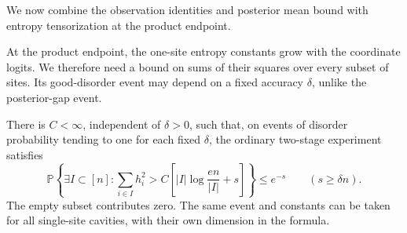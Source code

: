 We now combine the observation identities and posterior mean bound with
entropy tensorization at the product endpoint.

At the product endpoint, the one-site entropy constants grow with the
coordinate logits.  We therefore need a bound on sums of their squares
over every subset of sites.  Its good-disorder event may depend on a fixed
accuracy $\delta$, unlike the posterior-gap event.

\begin{lemma}\label{lem:stat-field-tails}
There is $C<\infty$, independent of $\delta>0$, such that, on events of
disorder probability tending to one for each fixed $\delta$, the ordinary
two-stage experiment satisfies
\begin{equation}\label{eq:stat-field-tails}
 \mathbb P\left\{\exists I\subset[n]:
  \sum_{i\in I}h_i^2>C\left[|I|\log\frac{en}{|I|}+s\right]\right\}
       \le e^{-s}\qquad(s\ge\delta n).
\end{equation}
The empty subset contributes zero.  The same event and constants can be
taken for all single-site cavities, with their own dimension in the formula.
\end{lemma}

